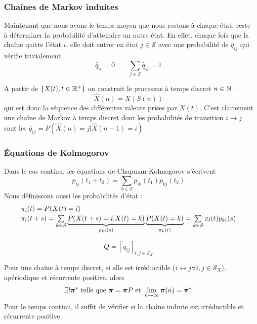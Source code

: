 \documentclass[11pt,a4paper]{article}
\numberwithin{equation}{section}
\begin{document}
\subsubsection{Chaînes de Markov induites}
Maintenant que nous avons le temps moyen que nous restons à chaque état, reste à déterminer la probabilité d'atteindre un autre état. En effet, chaque fois que la chaîne quitte l'état $i$, elle doit entrer en état $j \in \mathcal{S}$ avec une probabilité de $\hat{q}_{ij}$ qui vérifie trivialement
\begin{equation}
    \hat{q}_{ii} = 0 \qquad \sum_{j \in \mathcal{S}} \hat{q}_{ij} = 1
\end{equation}

A partir de $\{X(t), t \in \mathbb{R}^+\}$ on construit le processus à temps discret $n \in \mathbb{N}$ :
\begin{equation}
    \hat{X}(n) = X(S(n))
\end{equation}
qui est donc la séquence des différentes valeurs prises par $X(t)$. C'est clairement une chaîne de Markov à temps discret dont les probabilités de transition $i\to j$ sont les $\hat{q}_{ij} = P(\hat{X}(n) = j | \hat{X}(n-1) = i)$

\subsubsection{Équations de Kolmogorov}
Dans le cas continu, les équations de Chapman-Kolmogorov s'écrivent
\begin{equation}
    p_{ij}(t_1 + t_2) = \sum_{k \in \mathcal{S}}p_{ik}(t_1)p_{kj}(t_2)
\end{equation}
Nous définissons aussi les probabilités d'état :
\[\begin{array}{l}
    \pi_i(t) = P(X(t) = i)\\
    \pi_i(t+s) = \sum\limits_{k\in \mathcal{S}}^{} \underbrace{P(X(t+s) = i |X(t) = k)}_{p_{ki}(s)} \underbrace{P(X(t) = k)}_{\pi_k(t)} = \sum\limits_{k \in \mathcal{S}}^{} \pi_l(t) p_{ki}(s)
\end{array}\]


\begin{equation}
    Q = [q_{ij}]_{i,j \in \mathcal{S}_X}
\end{equation}

Pour une chaîne à temps discret, si elle est irréductible ($i \leftrightarrow j \forall i,j \in \mathcal{S}_X$), apériodique et récurrente positive, alors 
\[\exists ! \boldsymbol{\pi}^* \text{ telle que } \boldsymbol{\pi} = \boldsymbol{\pi}P \text{ et } \lim\limits_{n \to \infty} \boldsymbol{\pi}(n) = \boldsymbol{\pi}^*\]
Pour le temps continu, il suffit de vérifier si la chaîne induite est irréductible et récurrente positive.
\end{document}
